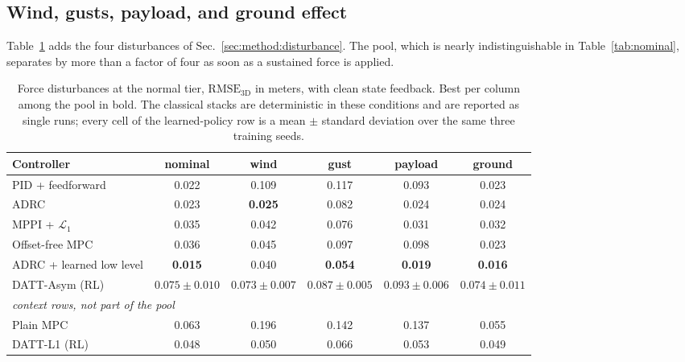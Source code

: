 \subsection{Wind, gusts, payload, and ground effect}
\label{sec:results:disturbance}

Table~\ref{tab:matrix} adds the four disturbances of
Sec.~\ref{sec:method:disturbance}. The pool, which is nearly indistinguishable in
Table~\ref{tab:nominal}, separates by more than a factor of four as soon as a sustained
force is applied.

\begin{table}[t]
\caption{Force disturbances at the normal tier, $\mathrm{RMSE}_{\mathrm{3D}}$ in meters,
with clean state feedback. Best per column among the pool in bold. The classical stacks
are deterministic in these conditions and are reported as single runs; every cell of the
learned-policy row is a mean $\pm$ standard deviation over the same three training
seeds.}
\label{tab:matrix}
\begin{center}\small
\begin{tabular}{lccccc}
\toprule
Controller & nominal & wind & gust & payload & ground \\
\midrule
PID + feedforward        & 0.022 & 0.109 & 0.117 & 0.093 & 0.023 \\
ADRC                     & 0.023 & \textbf{0.025} & 0.082 & 0.024 & 0.024 \\
MPPI + $\mathcal{L}_1$   & 0.035 & 0.042 & 0.076 & 0.031 & 0.032 \\
Offset-free MPC          & 0.036 & 0.045 & 0.097 & 0.098 & 0.023 \\
ADRC + learned low level & \textbf{0.015} & 0.040 & \textbf{0.054} & \textbf{0.019} & \textbf{0.016} \\
DATT-Asym (RL)           & $0.075\pm0.010$ & $0.073\pm0.007$ & $0.087\pm0.005$ & $0.093\pm0.006$ & $0.074\pm0.011$ \\
\midrule
\multicolumn{6}{l}{\emph{context rows, not part of the pool}} \\
Plain MPC                & 0.063 & 0.196 & 0.142 & 0.137 & 0.055 \\
DATT-L1 (RL)             & 0.048 & 0.050 & 0.066 & 0.053 & 0.049 \\
\bottomrule
\end{tabular}
\end{center}
\end{table}

